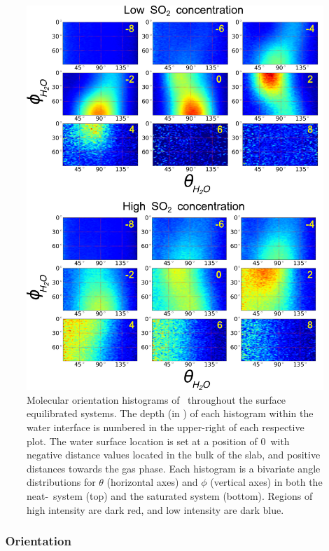 \begin{figure}[h!]
	\begin{center}
		\includegraphics[scale=1.0]{images/h2o-angles/theta-phi.png}
		\caption{Molecular orientation histograms of \wat~throughout the surface equilibrated systems. The depth (in \angs) of each histogram within the water interface is numbered in the upper-right of each respective plot. The water surface location is set at a position of 0\angs~with negative distance values located in the bulk of the slab, and positive distances towards the gas phase. Each histogram is a bivariate angle distributions for $\theta$ (horizontal axes) and $\phi$ (vertical axes) in both the neat-\wat~system (top) and the saturated system (bottom). Regions of high intensity are dark red, and low intensity are dark blue.}
		\label{fig:water-orientation}
	\end{center}
\end{figure}


\subsubsection{\suldiox~Orientation}


